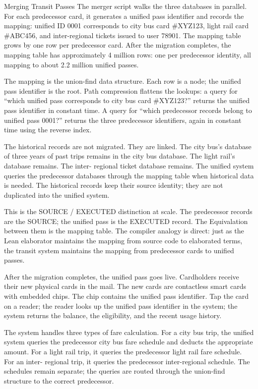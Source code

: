 \begin{coda}{Merging Transit Passes}
The merger script walks the three databases in parallel. For each
predecessor card, it generates a unified pass identifier and records
the mapping: unified ID 0001 corresponds to city bus card
\#XYZ123, light rail card \#ABC456, and inter-regional tickets
issued to user 78901. The mapping table grows by one row per
predecessor card. After the migration completes, the mapping table
has approximately 4 million rows: one per predecessor identity, all
mapping to about 2.2 million unified passes.

The mapping is the union-find data structure. Each row is a node;
the unified pass identifier is the root. Path compression flattens
the lookups: a query for ``which unified pass corresponds to city
bus card \#XYZ123?'' returns the unified pass identifier in
constant time. A query for ``which predecessor records belong to
unified pass 0001?'' returns the three predecessor identifiers,
again in constant time using the reverse index.

The historical records are not migrated. They are linked. The city
bus's database of three years of past trips remains in the city
bus database. The light rail's database remains. The inter-
regional ticket database remains. The unified system queries the
predecessor databases through the mapping table when historical
data is needed. The historical records keep their source identity;
they are not duplicated into the unified system.

This is the SOURCE / EXECUTED distinction at scale. The predecessor
records are the SOURCE; the unified pass is the EXECUTED record.
The Equivalation between them is the mapping table. The compiler
analogy is direct: just as the Lean elaborator maintains the
mapping from source code to elaborated terms, the transit system
maintains the mapping from predecessor cards to unified passes.

After the migration completes, the unified pass goes live. Cardholders
receive their new physical cards in the mail. The new cards are
contactless smart cards with embedded chips. The chip contains the
unified pass identifier. Tap the card on a reader; the reader looks
up the unified pass identifier in the system; the system returns the
balance, the eligibility, and the recent usage history.

The system handles three types of fare calculation. For a city bus
trip, the unified system queries the predecessor city bus fare
schedule and deducts the appropriate amount. For a light rail trip,
it queries the predecessor light rail fare schedule. For an inter-
regional trip, it queries the predecessor inter-regional schedule.
The schedules remain separate; the queries are routed through the
union-find structure to the correct predecessor.


\end{coda}
